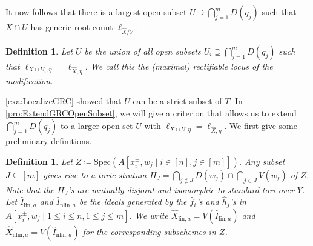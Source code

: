 \documentclass[12pt,reqno,a4paper]{amsart}
\theoremstyle{theoremstyle}
\theoremstyle{examplestyle}
\newtheorem{definition}[theorem]{Definition}
\theoremstyle{algorithmstyle}
\begin{document}
It now follows that there is a largest open subset $U\supseteq{\bigcap_{j=1}^{m}D(q_{j})}$ such that $X\cap U$ has generic root count $\ell_{\widehat{X}/{Y}}$.
\begin{definition}
  Let $U$ be the union of all open subsets $U_{i}\supseteq \bigcap_{j=1}^{m}D(q_{j})$ such that $\ell_{X\cap U_i,\eta}=\ell_{\widehat{X},\eta}$. We call this the \emph{(maximal) rectifiable locus} of the modification.
\end{definition}

\cref{exa:LocalizeGRC} showed that $U$ can be a strict subset of $T$. In \cref{pro:ExtendGRCOpenSubset}, we will give a criterion that allows us to extend ${\bigcap_{j=1}^{m}D(q_{j})}$ to a larger open set $U$ with $\ell_{X\cap U,\eta}=\ell_{\widehat{X},\eta}$. We first give some preliminary definitions.

\begin{definition}
  Let $Z\coloneqq \mathrm{Spec}(A[x_{i}^{\pm},w_{j}\mid i\in[n],j\in[m]])$. Any subset $J\subseteq [m]$ gives rise to a toric stratum $H_J = \bigcap_{j\notin J}D(w_{j})\cap \bigcap_{j\in J} V(w_{j})$ of $Z$.
  Note that the $H_{J}$'s are mutually disjoint and  isomorphic to standard tori over $Y$. Let $\widehat{I}_{\mathrm{lin},a}$ and $\widehat{I}_{\mathrm{nlin},a}$ be the ideals generated by the $\widehat{f}_{i}$'s and $\widehat{h}_{j}$'s in $A[x_{i}^{\pm},w_{j}\mid 1\leq{i}\leq{n},1\leq{j}\leq{m}]$. We write $\widehat{X}_{\mathrm{lin},a}=V(\widehat{I}_{\mathrm{lin},a})$ and $\widehat{X}_{\mathrm{nlin},a}=V(\widehat{I}_{\mathrm{nlin},a})$ for the corresponding subschemes in $Z$.
\end{definition}
\end{document}
